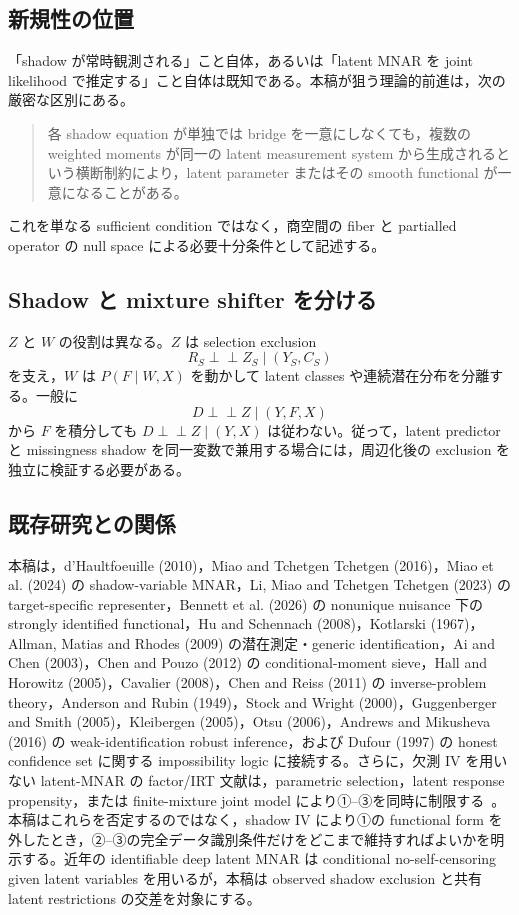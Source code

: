 \documentclass[11pt,a4paper]{ltjsarticle}
\theoremstyle{remark}
\newcommand{\ind}{\perp\!\!\!\perp}
\begin{document}
\subsection{新規性の位置}
「shadow が常時観測される」こと自体，あるいは「latent MNAR を joint likelihood で推定する」こと自体は既知である。本稿が狙う理論的前進は，次の厳密な区別にある。
\begin{quote}
各 shadow equation が単独では bridge を一意にしなくても，複数の weighted moments が同一の latent measurement system から生成されるという横断制約により，latent parameter またはその smooth functional が一意になることがある。
\end{quote}
これを単なる sufficient condition ではなく，商空間の fiber と partialled operator の null space による必要十分条件として記述する。

\subsection{Shadow と mixture shifter を分ける}
$Z$ と $W$ の役割は異なる。$Z$ は selection exclusion
\[
R_S\ind Z_S\mid(Y_S,C_S)
\]
を支え，$W$ は $P(F\mid W,X)$ を動かして latent classes や連続潜在分布を分離する。一般に
\[
D\ind Z\mid(Y,F,X)
\]
から $F$ を積分しても $D\ind Z\mid(Y,X)$ は従わない。従って，latent predictor と missingness shadow を同一変数で兼用する場合には，周辺化後の exclusion を独立に検証する必要がある。

\subsection{既存研究との関係}
本稿は，d'Haultfoeuille (2010)，Miao and Tchetgen Tchetgen (2016)，Miao et al. (2024) の shadow-variable MNAR，Li, Miao and Tchetgen Tchetgen (2023) の target-specific representer，Bennett et al. (2026) の nonunique nuisance 下の strongly identified functional，Hu and Schennach (2008)，Kotlarski (1967)，Allman, Matias and Rhodes (2009) の潜在測定・generic identification，Ai and Chen (2003)，Chen and Pouzo (2012) の conditional-moment sieve，Hall and Horowitz (2005)，Cavalier (2008)，Chen and Reiss (2011) の inverse-problem theory，Anderson and Rubin (1949)，Stock and Wright (2000)，Guggenberger and Smith (2005)，Kleibergen (2005)，Otsu (2006)，Andrews and Mikusheva (2016) の weak-identification robust inference，および Dufour (1997) の honest confidence set に関する impossibility logic に接続する。さらに，欠測 IV を用いない latent-MNAR の factor/IRT 文献は，parametric selection，latent response propensity，または finite-mixture joint model により①--③を同時に制限する~\cite{MuthenKaplanHollis1987,HolmanGlas2005,Lee2006,RoseVonDavierXu2010,RoseVonDavierNagengast2017,KuhaKatsikatsouMoustaki2018,BacciBartolucci2015}。本稿はこれらを否定するのではなく，shadow IV により①の functional form を外したとき，②--③の完全データ識別条件だけをどこまで維持すればよいかを明示する。近年の identifiable deep latent MNAR は conditional no-self-censoring given latent variables を用いるが，本稿は observed shadow exclusion と共有 latent restrictions の交差を対象にする。
\end{document}
